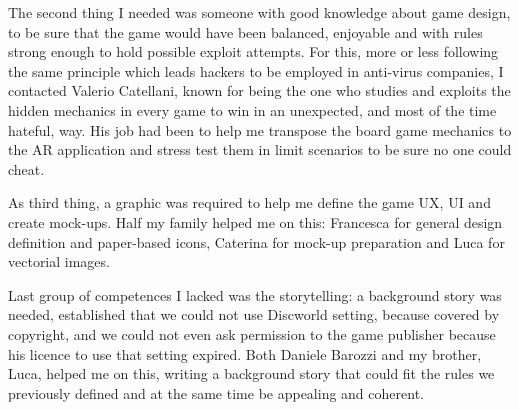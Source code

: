 		The second thing I needed was someone with good knowledge about game design, to be sure that the game would have been balanced, enjoyable and with rules strong enough to hold possible exploit attempts.
		For this, more or less following the same principle which leads hackers to be employed in anti-virus companies, I contacted Valerio Catellani, known for being the one who studies and exploits the hidden mechanics in every game to win in an unexpected, and most of the time hateful, way. His job had been to help me transpose the board game mechanics to the AR application and stress test them in limit scenarios to be sure no one could cheat.
		
		As third thing, a graphic was required to help me define the game UX, UI and create mock-ups. Half my family helped me on this: Francesca for general design definition and paper-based icons, Caterina for mock-up preparation and Luca for vectorial images.
		
		Last group of competences I lacked was the storytelling: a background story was needed, established that we could not use Discworld setting, because covered by copyright, and we could not even ask permission to the game publisher because his licence to use that setting expired. Both Daniele Barozzi and my brother, Luca, helped me on this, writing a background story that could fit the rules we previously defined and at the same time be appealing and coherent.